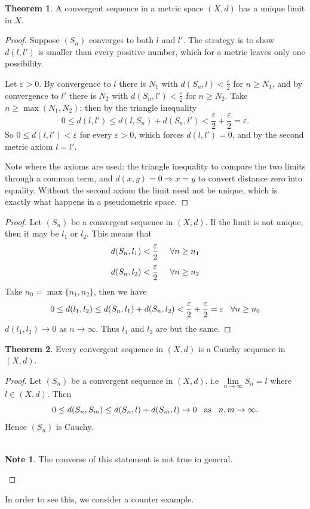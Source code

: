 \documentclass[11pt,a4paper]{article}
\theoremstyle{definition}
\newtheorem{thm}{Theorem}[section]
\newtheorem*{note}{Note}
\begin{document}
\begin{thm}
A convergent sequence in a metric space $(X,d)$ has a unique limit in $X$.
\end{thm}
\begin{proof}
Suppose $(S_n)$ converges to both $l$ and $l'$. The strategy is to show
$d(l,l')$ is smaller than every positive number, which for a metric leaves only
one possibility.

Let $\varepsilon>0$. By convergence to $l$ there is $N_1$ with
$d(S_n,l)<\frac{\varepsilon}{2}$ for $n\geq N_1$, and by convergence to $l'$
there is $N_2$ with $d(S_n,l')<\frac{\varepsilon}{2}$ for $n\geq N_2$. Take
$n\geq\max(N_1,N_2)$; then by the triangle inequality
$$0\leq d(l,l')\leq d(l,S_n)+d(S_n,l')<\frac{\varepsilon}{2}+\frac{\varepsilon}{2}
=\varepsilon .$$
So $0\leq d(l,l')<\varepsilon$ for every $\varepsilon>0$, which forces
$d(l,l')=0$, and by the second metric axiom $l=l'$.

Note where the axioms are used: the triangle inequality to compare the two
limits through a common term, and $d(x,y)=0\Rightarrow x=y$ to convert distance
zero into equality. Without the second axiom the limit need not be unique,
which is exactly what happens in a pseudometric space.
\end{proof}


\begin{proof}
Let $(S_n)$ be a convergent sequence in $(X,d)$. If the limit is not unique, then it may be $l_1$ or $l_2$. This means that $$d(S_n,l_1)<\frac{\varepsilon}{2}\hspace{0.5cm}\forall n\geq n_1$$ $$d(S_n,l_2)<\frac{\varepsilon}{2}\hspace{0.5cm} \forall n\geq n_2$$ Take $n_0=\max\{n_1,n_2\}$, then we have $$0\leq d(l_1,l_2)\leq d(S_n,l_1)+d(S_n,l_2)<\frac{\varepsilon}{2}+\frac{\varepsilon}{2}=\varepsilon \hspace{0.3cm} \forall n\geq n_0$$ $d(l_1,l_2)\rightarrow 0$ as $n\rightarrow \infty$. Thus $l_1$ and $l_2$ are but the same.
\end{proof}


\begin{thm}
Every convergent sequence in $(X,d)$ is a Cauchy sequence in $(X,d)$.

\end{thm}

\begin{proof}
Let $(S_n)$ be a convergent sequence in $(X,d)$. i.e $\lim\limits_{n\rightarrow \infty}S_n=l$ where $l\in (X,d)$. Then $$0\leq d(S_n,S_m)\leq d(S_n,l)+d(S_m,l)\rightarrow 0\hspace{0.3cm}\text{as}\hspace{0.3cm} n,m\rightarrow \infty.$$ Hence $(S_n)$ is Cauchy.\\\\
\begin{note}
The converse of this statement is not true in general.
\end{note}

\end{proof}
In order to see this, we consider a counter example.
\end{document}
